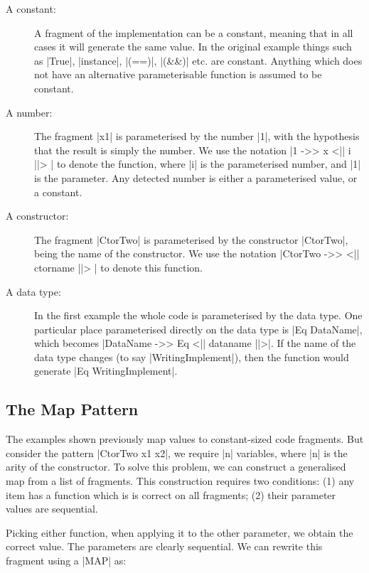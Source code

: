 \documentclass{llncs}
\begin{document}
\begin{description}
\item[A constant:] A fragment of the implementation can be a constant, meaning that in all cases it will generate the same value. In the original example things such as |True|, |instance|, |(==)|, |(&&)| etc. are constant. Anything which does not have an alternative parameterisable function is assumed to be constant.

\item[A number:] The fragment |x1| is parameterised by the number |1|, with the hypothesis that the result is simply the number. We use the notation |1 ->> x <|| i ||> | to denote the function, where |i| is the parameterised number, and |1| is the parameter. Any detected number is either a parameterised value, or a constant.

\item[A constructor:] The fragment |CtorTwo| is parameterised by the constructor |CtorTwo|, being the name of the constructor. We use the notation |CtorTwo ->> <|| ctorname ||> | to denote this function.

\item[A data type:] In the first example the whole code is parameterised by the data type. One particular place parameterised directly on the data type is |Eq DataName|, which becomes |DataName ->> Eq <|| dataname ||>|. If the name of the data type changes (to say |WritingImplement|), then the function would generate |Eq WritingImplement|.
\end{description}

\subsection{The Map Pattern}
\label{sec:induction}

The examples shown previously map values to constant-sized code fragments. But consider the pattern |CtorTwo x1 x2|, we require |n| variables, where |n| is the arity of the constructor. To solve this problem, we can construct a generalised map from a list of fragments. This construction requires two conditions: (1) any item has a function which is is correct on all fragments; (2) their parameter values are sequential.

\begin{code}
[1 ->> x <| i |>, 2 ->> x <| i |>]
\end{code}

Picking either function, when applying it to the other parameter, we obtain the correct value. The parameters are clearly sequential. We can rewrite this fragment using a |MAP| as:
\end{document}
